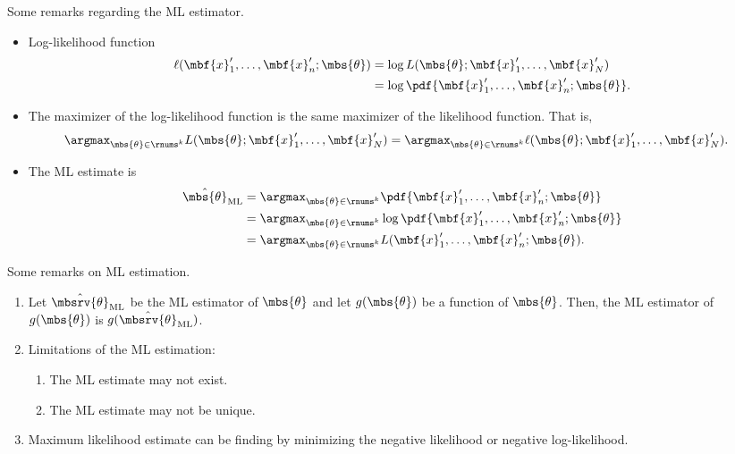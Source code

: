 \begin{myremark}
    Some remarks regarding the ML estimator.
    \begin{itemize}
        \item Log-likelihood function 
        \begin{align}
            \ell(\mbf{x}_{1}',\ldots,\mbf{x}_{n}';\mbs{\theta}) 
            &= \log L(\mbs{\theta}; \mbf{x}_{1}', \ldots, \mbf{x}_{N}')\\
            &= \log \pdf{\mbf{x}_{1}',\ldots, \mbf{x}_{n}';\mbs{\theta}}.
        \end{align}
        \item The maximizer of the log-likelihood function is the same maximizer of the likelihood function. That is,
        \begin{align}
            \argmax_{\mbs{\theta}\in\rnums^{k}} L(\mbs{\theta}; \mbf{x}_{1}', \ldots, \mbf{x}_{N}')
            &= \argmax_{\mbs{\theta}\in\rnums^{k}} \ell(\mbs{\theta}; \mbf{x}_{1}', \ldots, \mbf{x}_{N}').
        \end{align}
        \item The ML estimate is 
        \begin{align}
            \hat{\mbs{\theta}}_{\mathrm{ML}} 
            &= \argmax_{\mbs{\theta}\in\rnums^{k}} \pdf{\mbf{x}_{1}',\ldots, \mbf{x}_{n}';\mbs{\theta}}\\
            &= \argmax_{\mbs{\theta}\in\rnums^{k}} \log \pdf{\mbf{x}_{1}',\ldots, \mbf{x}_{n}';\mbs{\theta}}\\
            &= \argmax_{\mbs{\theta}\in\rnums^{k}} L(\mbf{x}_{1}',\ldots,\mbf{x}_{n}';\mbs{\theta}).
        \end{align}
    \end{itemize}
\end{myremark}

\begin{myremark}
    Some remarks on ML estimation.
    \begin{enumerate}
        \item Let $\hat{\mbsrv{\theta}}_{\mathrm{ML}}$ be the ML estimator of $\mbs{\theta}$ and let $g(\mbs{\theta})$ be a function of $\mbs{\theta}$. Then, the ML estimator of $g(\mbs{\theta})$ is $g(\hat{\mbsrv{\theta}}_{\mathrm{ML}})$.
        
        \item Limitations of the ML estimation:
        \begin{enumerate}
            \item The ML estimate may not exist.
            \item The ML estimate may not be unique. 
        \end{enumerate}        
        
        \item Maximum likelihood estimate can be finding by minimizing the negative likelihood or negative log-likelihood.
    \end{enumerate}
\end{myremark}
    
